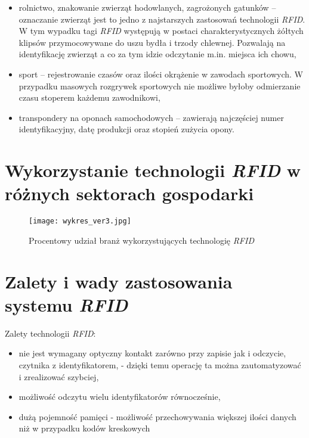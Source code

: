 \begin{itemize}
\begin{itemize}
\begin{itemize}
	\item rolnictwo, znakowanie zwierząt hodowlanych, zagrożonych gatunków –oznaczanie zwierząt jest to jedno z najstarszych zastosowań technologii \emph{RFID}. W tym wypadku tagi \emph{RFID} występują w postaci charakterystycznych żółtych klipsów przymocowywane do uszu bydła i trzody chlewnej. Pozwalają na identyfikację zwierząt a co za tym idzie odczytanie m.in. miejsca ich chowu,
	
	\item sport – rejestrowanie czasów oraz ilości okrążenie w zawodach sportowych.  W przypadku masowych rozgrywek sportowych  nie możliwe byłoby odmierzanie czasu stoperem każdemu zawodnikowi,
	
	\item transpondery na oponach samochodowych – zawierają najczęściej numer identyfikacyjny, datę produkcji oraz stopień zużycia opony.

\end{itemize}

\newpage
\section{Wykorzystanie technologii \emph{RFID} w różnych sektorach gospodarki}

	\begin{figure}[h!]
	\centering
	    \texttt{[image: wykres\_ver3.jpg]}
	    \caption{Procentowy udział branż wykorzystujących technologię \emph{RFID}}
	\end{figure}


\section {Zalety i wady zastosowania systemu \emph{RFID}}

Zalety technologii \emph{RFID}:

\begin{itemize}\setlength{\itemsep}{0pt}
	\item nie jest wymagany optyczny kontakt zarówno przy zapisie jak i odczycie, czytnika z identyfikatorem, - dzięki temu operację ta można zautomatyzować i zrealizować szybciej,
	
	\item możliwość odczytu wielu identyfikatorów równocześnie,
	
	\item dużą  pojemność pamięci  - możliwość przechowywania większej ilości danych niż w przypadku kodów kreskowych


\end{itemize}
\end{itemize}
\end{itemize}

